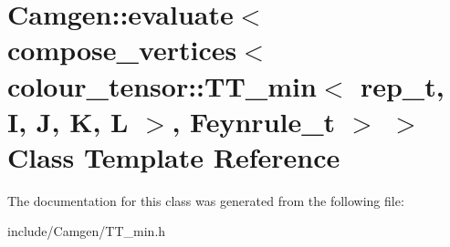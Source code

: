 \hypertarget{a00178}{}\section{Camgen\+:\+:evaluate$<$ compose\+\_\+vertices$<$ colour\+\_\+tensor\+:\+:T\+T\+\_\+min$<$ rep\+\_\+t, I, J, K, L $>$, Feynrule\+\_\+t $>$ $>$ Class Template Reference}
\label{a00178}


The documentation for this class was generated from the following file\+:\begin{DoxyCompactItemize}
\item 
include/\+Camgen/T\+T\+\_\+min.\+h\end{DoxyCompactItemize}
